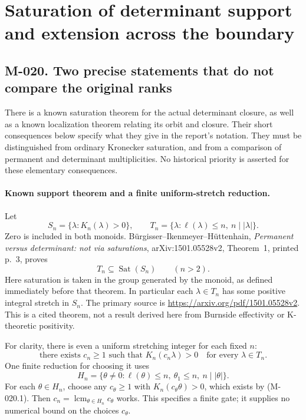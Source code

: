 \section{Saturation of determinant support and extension across the boundary}

\subsection*{M-020. Two precise statements that do not compare the original ranks}
There is a known saturation theorem for the actual determinant closure,
as well as a known localization theorem relating its orbit and closure.
Their short consequences below specify what they give in the report's
notation. They must be distinguished from ordinary Kronecker saturation,
and from a comparison of permanent and determinant multiplicities.
No historical priority is asserted for these elementary consequences.

\paragraph{Known support theorem and a finite uniform-stretch reduction.}
Let
\[
 S_n=\{\lambda:K_n(\lambda)>0\},\qquad
 T_n=\{\lambda:\ell(\lambda)\leq n,\ n\mid |\lambda|\}.
\]
Zero is included in both monoids. B\"urgisser--Ikenmeyer--H\"uttenhain,
\emph{Permanent versus determinant: not via saturations},
arXiv:1501.05528v2, Theorem~1, printed p.~3, proves
\[
                         T_n\subseteq\operatorname{Sat}(S_n)
                         \qquad(n>2).                         \tag{M-020.1}
\]
Here saturation is taken in the group generated by the monoid,
as defined immediately before that theorem. In particular each
\(\lambda\in T_n\) has some positive integral stretch in \(S_n\).
The primary source is \url{https://arxiv.org/pdf/1501.05528v2}.
This is a cited theorem, not a result derived here from Burnside
effectivity or K-theoretic positivity.

For clarity, there is even a uniform stretching integer for each
fixed \(n\):
\[
 \text{there exists }c_n\geq1\text{ such that }
            K_n(c_n\lambda)>0\quad\text{for every }\lambda\in T_n.
                                                               \tag{M-020.2}
\]
One finite reduction for choosing it uses
\[
 H_n=\{\theta\ne0:\ell(\theta)\leq n,\ \theta_1\leq n,
                                      \ n\mid |\theta|\}.
                                                               \tag{M-020.3}
\]
For each \(\theta\in H_n\), choose any \(c_\theta\geq1\)
with \(K_n(c_\theta\theta)>0\), which exists by (M-020.1).
Then \(c_n=\operatorname{lcm}_{\theta\in H_n}c_\theta\)
works. This specifies a finite gate; it supplies no numerical
bound on the choices \(c_\theta\).

